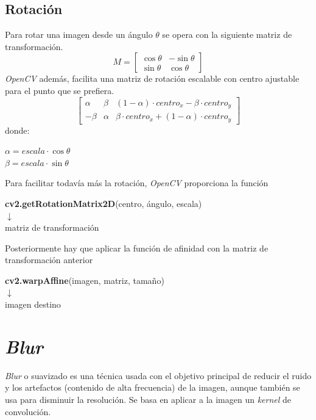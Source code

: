 \subsection{Rotación}
Para rotar una imagen desde un ángulo $\theta$ se opera con la siguiente
matriz de transformación.
\begin{equation*}
  M =
  \begin{bmatrix}
    \cos \theta & -\sin \theta \\ \sin \theta & \cos \theta
  \end{bmatrix}
\end{equation*}
\emph{OpenCV} además, facilita una matriz de rotación escalable con
centro ajustable para el punto que se prefiera.
\begin{equation*}
  \begin{bmatrix}
    \alpha & \beta & (1 - \alpha) \cdot centro_x - \beta \cdot centro_y \\
    - \beta & \alpha & \beta \cdot centro_x + (1 - \alpha) \cdot centro_y
  \end{bmatrix}
\end{equation*}
donde:
\begin{center}
  $ \alpha = escala \cdot \cos \theta $
  \\
  $ \beta = escala \cdot \sin \theta $
\end{center}
Para facilitar todavía más la rotación, \emph{OpenCV} proporciona la
función
\begin{center}
  \textbf{cv2.getRotationMatrix2D}(centro, ángulo, escala) \\
  $\downarrow$ \\
  matriz de transformación
\end{center}
Posteriormente hay que aplicar la función de afinidad con la matriz de transformación anterior \\
\begin{center}
  \textbf{cv2.warpAffine}(imagen, matriz, tamaño)\\
  $\downarrow$ \\
  imagen destino
\end{center}

\section{\emph{Blur}}
\emph{Blur} o suavizado es una técnica usada con el objetivo principal
de reducir el ruido y los artefactos (contenido de alta frecuencia) de
la imagen, aunque también se usa para disminuir la resolución. Se basa
en aplicar a la imagen un \emph{kernel} de convolución.
